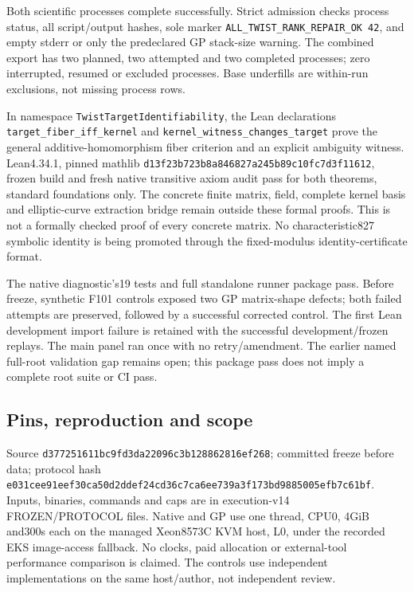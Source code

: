 \documentclass[
  10pt,
]{article}
\begin{document}
Both scientific processes complete successfully. Strict admission checks
process status, all script/output hashes, sole marker
\texttt{ALL\_TWIST\_RANK\_REPAIR\_OK\ 42}, and empty stderr or only the
predeclared GP stack-size warning. The combined export has two planned,
two attempted and two completed processes; zero interrupted, resumed or
excluded processes. Base underfills are within-run exclusions, not
missing process rows.

In namespace \texttt{TwistTargetIdentifiability}, the Lean declarations
\texttt{target\_fiber\_iff\_kernel} and
\texttt{kernel\_witness\_changes\_target} prove the general
additive-homomorphism fiber criterion and an explicit ambiguity witness.
Lean4.34.1, pinned mathlib
\texttt{d13f23b7\allowbreak{}23b8a846\allowbreak{}827a245b\allowbreak{}89c10fc7\allowbreak{}d3f11612}, frozen build and
fresh native transitive axiom audit pass for both theorems, standard
foundations only. The concrete finite matrix, field, complete kernel
basis and elliptic-curve extraction bridge remain outside these formal
proofs. This is not a formally checked proof of every concrete matrix.
No characteristic827 symbolic identity is being promoted through the
fixed-modulus identity-certificate format.

The native diagnostic's19 tests and full standalone runner package pass.
Before freeze, synthetic F101 controls exposed two GP matrix-shape
defects; both failed attempts are preserved, followed by a successful
corrected control. The first Lean development import failure is retained
with the successful development/frozen replays. The main panel ran once
with no retry/amendment. The earlier named full-root validation gap
remains open; this package pass does not imply a complete root suite or
CI pass.

\subsection{Pins, reproduction and
scope}\label{pins-reproduction-and-scope}

Source \texttt{d3772516\allowbreak{}11bc9fd3\allowbreak{}da22096c\allowbreak{}3b128862\allowbreak{}816ef268}; committed
freeze before data; protocol hash
\texttt{e031cee9\allowbreak{}1eef30ca\allowbreak{}50d2ddef\allowbreak{}24cd36c7\allowbreak{}ca6ee739\allowbreak{}a3f173bd\allowbreak{}9885005e\allowbreak{}fb7c61bf}.
Inputs, binaries, commands and caps are in execution-v14 FROZEN/PROTOCOL
files. Native and GP use one thread, CPU0, 4GiB and300s each on the
managed Xeon8573C KVM host, L0, under the recorded EKS image-access
fallback. No clocks, paid allocation or external-tool performance
comparison is claimed. The controls use independent implementations on
the same host/author, not independent review.
\end{document}
